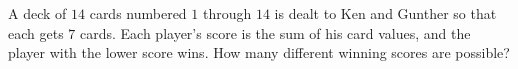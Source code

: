 A deck of $14$ cards numbered $1$ through $14$ is dealt to Ken and Gunther so that each gets $7$ cards. Each player's score is the sum of his card values, and the player with the lower score wins. How many different winning scores are possible?

